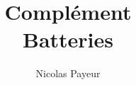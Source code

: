 \documentclass[12pt,oneside,letterpaper]{article}
\begin{document}
\title{\textbf{Complément}\\Batteries}
\author{Nicolas Payeur}
\date{}
\maketitle
\end{document}
